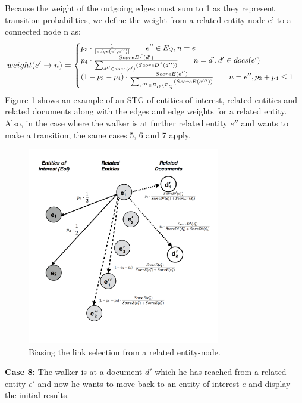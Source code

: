 \documentclass{article}
\begin{document}
Because the weight of the outgoing edges must sum to 1 as they represent transition
probabilities, we define the weight from a related entity-node e' to a connected 
node n as:
\begin{gather}
\small
weight(e' \rightarrow n) = \begin{cases}
    p_3 \cdot \frac{1}{|edge(e', e'')|} \qquad e'' \in E_Q, n = e\\
    p_4 \cdot \frac{ScoreD^{f}(d')}{\sum_{d'' \in docs(e')}(ScoreD^{f}(d''))} \qquad n= d', d' \in docs(e') \\
    (1-p_3-p_4) \cdot {\frac{ScoreE(e'')}{\sum_{e''' \in E_D \setminus E_Q}(ScoreE(e'''))}} \qquad n = e'',p_3 + p_4 \leq 1
\end{cases}
\end{gather}
Figure \ref{fig:entity_weighting} shows an example of an STG of entities of interest, related entities and 
related documents along with the edges and edge weights for a related entity.
Also, in the case where the walker is at further related entity $e''$ and wants to 
make a transition, the same cases 5, 6 and 7 apply.  

\begin{figure}[ht]
\begin{mdframed}
	\centering
	\includegraphics[width=0.75\textwidth]{entities_weighting}
\end{mdframed}
	\caption{Biasing the link selection from a related entity-node.}
	\label{fig:entity_weighting}
\end{figure}

\vspace{2mm}\noindent
{\bf Case 8:} The walker is at a document $d'$ which he has reached from a related
entity $e'$ and now he wants to move back to an entity of interest $e$ and display
the initial results. 
\end{document}
